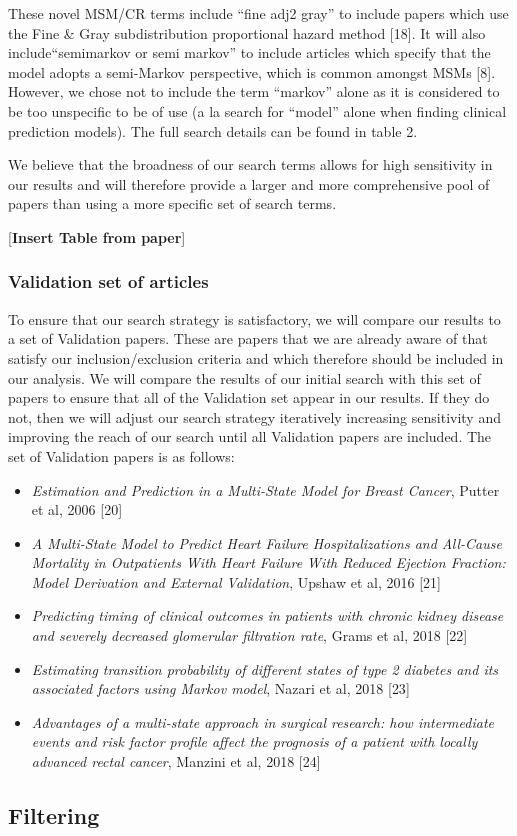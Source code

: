 \documentclass[12pt,PhD,twoside,openright]{muthesis}
\providecommand{\tightlist}{%
  \setlength{\itemsep}{0pt}\setlength{\parskip}{0pt}}
\begin{document}
These novel MSM/CR terms include ``fine adj2 gray'' to include papers which use the Fine \& Gray subdistribution proportional hazard method {[}18{]}. It will also include``semimarkov or semi markov'' to include articles which specify that the model adopts a semi-Markov perspective, which is common amongst MSMs {[}8{]}. However, we chose not to include the term ``markov'' alone as it is considered to be too unspecific to be of use (a la search for ``model'' alone when finding clinical prediction models). The full search details can be found in table 2.

We believe that the broadness of our search terms allows for high sensitivity in our results and will therefore provide a larger and more comprehensive pool of papers than using a more specific set of search terms.

{[}\textbf{Insert Table from paper}{]}

\hypertarget{validation-set-of-articles}{%
\subsubsection{Validation set of articles}\label{validation-set-of-articles}}

To ensure that our search strategy is satisfactory, we will compare our results to a set of Validation papers. These are papers that we are already aware of that satisfy our inclusion/exclusion criteria and which therefore should be included in our analysis. We will compare the results of our initial search with this set of papers to ensure that all of the Validation set appear in our results. If they do not, then we will adjust our search strategy iteratively increasing sensitivity and improving the reach of our search until all Validation papers are included. The set of Validation papers is as follows:
\begin{itemize}
\tightlist
\item
  \emph{Estimation and Prediction in a Multi-State Model for Breast Cancer}, Putter et al, 2006 {[}20{]}
\item
  \emph{A Multi-State Model to Predict Heart Failure Hospitalizations and All-Cause Mortality in Outpatients With Heart Failure With Reduced Ejection Fraction: Model Derivation and External Validation}, Upshaw et al, 2016 {[}21{]}
\item
  \emph{Predicting timing of clinical outcomes in patients with chronic kidney disease and severely decreased glomerular filtration rate}, Grams et al, 2018 {[}22{]}
\item
  \emph{Estimating transition probability of different states of type 2 diabetes and its associated factors using Markov model}, Nazari et al, 2018 {[}23{]}
\item
  \emph{Advantages of a multi-state approach in surgical research: how intermediate events and risk factor profile affect the prognosis of a patient with locally advanced rectal cancer}, Manzini et al, 2018 {[}24{]}
\end{itemize}
\hypertarget{filtering}{%
\subsection{Filtering}\label{filtering}}
\end{document}

